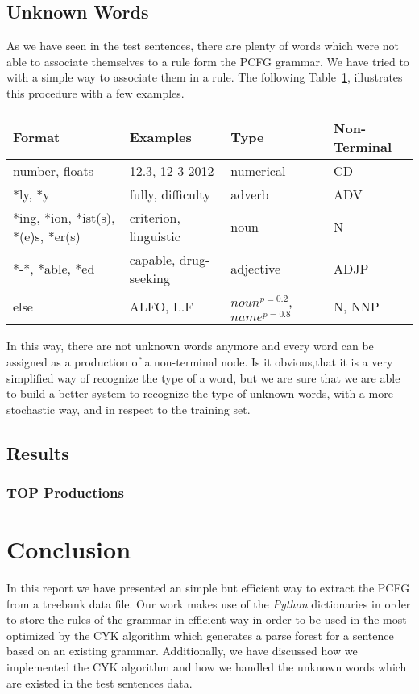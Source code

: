 \documentclass[a4paper,11pt]{article}
\begin{document}
\subsection{Unknown Words}
As we have seen in the test sentences, there are plenty of words which were not able to associate themselves to a rule form the PCFG grammar. We have tried to with a simple way to associate them in a rule. The following Table~\ref{unknown}, illustrates this procedure with a few examples.
\begin{table}[h!]
\label{unknown}
\begin{center}
    \begin{tabular}{|l|l|l|l|}
\hline
        \textbf{Format} & \textbf{Examples} & \textbf{Type} & \textbf{Non-Terminal} \\
		\hline
        number, floats & 12.3, 12-3-2012 & numerical & CD \\ \hline
        *ly, *y & fully, difficulty & adverb & ADV \\ \hline
		*ing, *ion, *ist(s), *(e)s, *er(s) & criterion, linguistic & noun & N \\ \hline
        *-*, *able, *ed & capable, drug-seeking & adjective &  ADJP  \\ \hline
		else & ALFO, L.F & $noun^{p=0.2}$, $name^{p=0.8}$  & N, NNP \\ \hline
    \end{tabular}
\end{center}
\end{table}
In this way, there are not unknown words anymore and every word can be assigned as a production of a non-terminal node. Is it obvious,that it is a very simplified way of recognize the type of a word, but we are sure that we are able to build a better system to recognize the type of unknown words, with a more stochastic way, and in respect to the training set.

\subsection{Results}

\subsubsection{TOP Productions}

\section{Conclusion}
\label{concl}
In this report we have presented an simple but efficient way to extract the PCFG from a
treebank data file. Our work makes use of the \textit{Python} dictionaries in order to store the rules of the grammar in efficient way in order to be used in the most optimized by the CYK algorithm which generates a parse forest for a sentence based on
an existing grammar. Additionally, we have discussed how we implemented the CYK algorithm and how we handled the unknown words which are existed in the test sentences data.
\end{document}
